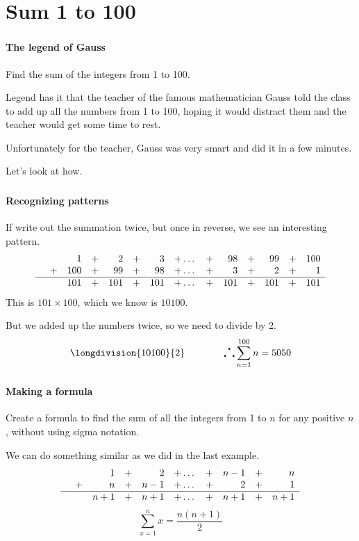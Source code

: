 \documentclass{beamer}
\begin{document}
	\section{Sum 1 to 100}
	\begin{frame}
		\frametitle{\secname}
		\framesubtitle{The legend of Gauss}
		\begin{example}
			Find the sum of the integers from 1 to 100.
		\end{example}
		Legend has it that the teacher of the famous mathematician Gauss told the class to add up all the numbers from 1 to 100, hoping it would distract them and the teacher would get some time to rest.

		Unfortunately for the teacher, Gauss was very smart and did it in a few minutes.

		Let's look at how.
	\end{frame}
	\begin{frame}
		\frametitle{\secname}
		\framesubtitle{Recognizing patterns}
		If write out the summation twice, but once in reverse, we see an interesting pattern.
		\begin{equation*}
			\begin{array}{lrrrrrrrrrrrrrrrrrrrrr}
				&    &1 &+  &2  &+  &3 &+  \dots &+ &98  &+ &99  &+ &100\\
				&+ &100 &+ &99  &+ &98 &+  \dots &+  &3  &+  &2  &+ &1\\\hline
				&  &101 &+ &101 &+ &101 &+ \dots &+ &101 &+ &101 &+ &101
			\end{array}
		\end{equation*}
		This is $101 \times 100$, which we know is $10100$.

		But we added up the numbers twice, so we need to divide by 2.
		\rmfamily
		\[\longdivision{10100}{2} \qquad\qquad \text{\LARGE$\therefore$}\sum_{n=1}^{100}n = 5050\]
	\end{frame}
	\begin{frame}
		\frametitle{\secname}
		\framesubtitle{Making a formula}
		\begin{example}
			Create a formula to find the sum of all the integers from 1 to $n$ for any positive $n$, without using sigma notation.
		\end{example}
		\pause
		We can do something similar as we did in the last example.
		\pause
		\begin{equation*}
			\begin{array}{lrrrrrrrrrrrrrrrrrrrrr}
				&    &1 &+   &2 &+ \dots &+ &n-1 &+ &n\\
				&+   &n &+ &n-1 &+ \dots &+   &2 &+ &1\\\hline
				&  &n+1 &+ &n+1 &+ \dots &+ &n+1 &+ &n+1
			\end{array}
		\end{equation*}
		\pause
		\[\sum_{x=1}^{n}x = \frac{n(n+1)}{2}\]
	\end{frame}
\end{document}
